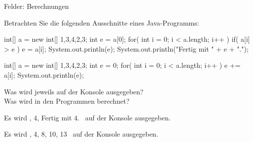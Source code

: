 \begin{exercise}{Felder: Berechnungen}
\begin{body}
Betrachten Sie die folgenden Ausschnitte eines Java-Programms:

\begin{parts}
\item 
\begin{displaycode}
    int[] a = new  int[] {1,3,4,2,3};
    int  e = a[0];
    for( int i = 0; i < a.length; i++ ) {
      if( a[i] > e ) {
        e = a[i];
        System.out.println(e);
      }
    }
    System.out.println("Fertig mit " + e + ".");
\end{displaycode}

\item
\begin{displaycode}
    int[] a = new  int[] {1,3,4,2,3};
    int  e = 0;
    for( int i = 0; i < a.length; i++ ) {
      e += a[i];
      System.out.println(e);
    }
\end{displaycode}
\end{parts}
Was wird jeweils auf der Konsole ausgegeben?\\
Was wird in den Programmen berechnet?
\end{body}


\begin{solution}
\begin{parts}
\item
Es wird , 4, Fertig mit 4. \grqq\ auf der Konsole ausgegeben.

\item
Es wird , 4, 8, 10, 13 \grqq\ auf der Konsole ausgegeben.
\end{parts}
\end{solution}
\end{exercise}
